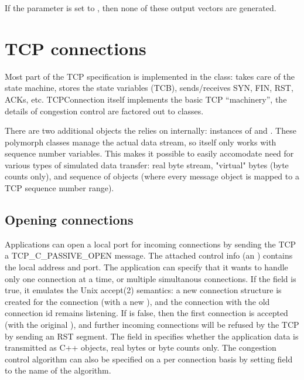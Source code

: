If the  parameter is set to , then none
of these output vectors are generated.

% 
% 

\section{TCP connections}

Most part of the TCP specification is implemented in the
 class: takes care of the state machine,
stores the state variables (TCB), sends/receives SYN, FIN, RST, ACKs, etc. 
TCPConnection itself implements the basic TCP ``machinery'', 
the details of congestion control are factored out to
 classes.

There are two additional objects the 
relies on internally: instances of  and
. These polymorph classes manage the actual data stream,
so  itself only works with sequence number variables.
This makes it possible to easily accomodate need for various types of
simulated data transfer: real byte stream, "virtual" bytes (byte counts
only), and sequence of  objects (where every message object is
mapped to a TCP sequence number range).

\subsection{Opening connections}

Applications can open a local port for incoming connections by sending
the TCP a TCP\_C\_PASSIVE\_OPEN message. The attached control info
(an ) contains the local address and port.
The application can specify that it wants to handle
only one connection at a time, or multiple simultanous connections. If the
 field is true, it emulates the Unix accept(2) semantics: a new
connection structure is created for the connection (with a new ),
and the connection with the old connection id remains listening.
If  is false, then the first connection is accepted
(with the original ),
and further incoming connections will be refused by the TCP by sending an RST segment.
The  field in  specifies
whether the application data is transmitted as C++ objects, real bytes or byte
counts only. The congestion control algorithm can also be specified
on a per connection basis by setting  field to the
name of the algorithm.

